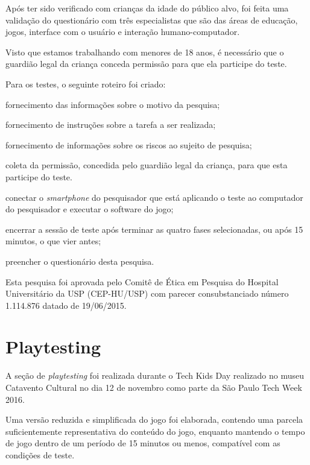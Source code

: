 Após ter sido verificado com crianças da idade do público alvo, 
foi feita uma validação do questionário com três especialistas 
que são das áreas de educação, jogos, interface com o usuário e 
interação humano-computador.

Visto que estamos trabalhando com menores de 18 anos, é necessário 
que o guardião legal da criança conceda permissão para que ela 
participe do teste.	

Para os testes, o seguinte roteiro foi criado:

\begin{alineas}
	\item fornecimento das informações sobre o motivo da pesquisa;
	\item fornecimento de instruções sobre a tarefa a ser realizada;
	\item fornecimento de informações sobre os riscos ao sujeito de pesquisa;
	\item coleta da permissão, concedida pelo guardião legal da criança, para que esta participe do teste.
	\item conectar o \textit{smartphone} do pesquisador que está aplicando o teste ao computador do pesquisador e executar o software do jogo; 
	\item encerrar a sessão de teste após terminar as quatro fases selecionadas, ou após 15 minutos, o que vier antes;
	\item preencher o questionário desta pesquisa.
\end{alineas}



Esta pesquisa foi aprovada pelo Comitê de Ética em Pesquisa do 
Hospital Universitário da USP (CEP-HU/USP) com parecer 
consubstanciado número 1.114.876 datado de 19/06/2015.

\section{Playtesting}\label{sec-playtesting}

A seção de \textit{playtesting} foi realizada durante o Tech Kids Day 
realizado no museu Catavento Cultural no dia 12 de novembro como parte 
da São Paulo Tech Week 2016. 

Uma versão reduzida e simplificada do jogo foi elaborada, contendo uma 
parcela suficientemente representativa do conteúdo do jogo, enquanto 
mantendo o tempo de jogo dentro de um período de 15 minutos ou menos, 
compatível com as condições de teste.

